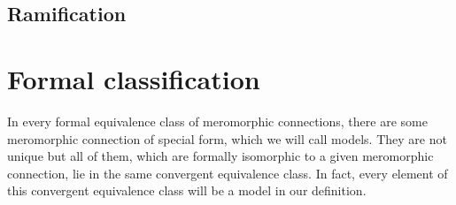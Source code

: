 

\subsection{Ramification}
\begin{comment}
  \cite[I.5.4.1]{sabbah_cimpa90}
\end{comment}

\section{Formal classification}
In every formal equivalence class of meromorphic connections, there are some
meromorphic connection of special form, which we will call models. They are not
unique but all of them, which are formally isomorphic to a given meromorphic
connection, lie in the same convergent equivalence class.
In fact, every element of this convergent equivalence class will be a model in
our definition.

